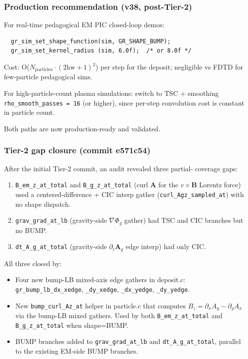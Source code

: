 \documentclass[11pt,a4paper]{article}
\newcommand{\vv}[1]{\mathbf{#1}}
\begin{document}
\subsubsection*{Production recommendation (v38, post-Tier-2)}

For real-time pedagogical EM PIC closed-loop demos:
\begin{eqbox}
\begin{verbatim}
  gr_sim_set_shape_function(sim, GR_SHAPE_BUMP);
  gr_sim_set_kernel_radius (sim, 6.0f);  /* or 8.0f */
\end{verbatim}
\end{eqbox}

Cost: O($N_\mathrm{particles} \cdot (2 \mathrm{hw}+1)^2$) per step for
the deposit; negligible vs FDTD for few-particle pedagogical sims.

For high-particle-count plasma simulations: switch to TSC + smoothing
\texttt{rho\_smooth\_passes = 16} (or higher), since per-step
convolution cost is constant in particle count.

Both paths are now production-ready and validated.

\subsubsection*{Tier-2 gap closure (commit e571c54)}

After the initial Tier-2 commit, an audit revealed three partial-
coverage gaps:

\begin{enumerate}
  \item \texttt{B\_em\_z\_at\_total} and \texttt{B\_g\_z\_at\_total}
    (curl $\vv A$ for the $v\times \vv B$ Lorentz force) used a
    centered-difference + CIC interp gather (\texttt{curl\_Agz\_sampled\_at})
    with no shape dispatch.
  \item \texttt{grav\_grad\_at\_lb} (gravity-side $\nabla\Phi_g$
    gather) had TSC and CIC branches but no BUMP.
  \item \texttt{dt\_A\_g\_at\_total} (gravity-side $\partial_t\vv A_g$
    edge interp) had only CIC.
\end{enumerate}

All three closed by:
\begin{itemize}
  \item Four new bump-LB mixed-axis edge gathers in deposit.c:
    \texttt{gr\_bump\_lb\_dx\_xedge}, \texttt{\_dy\_xedge},
    \texttt{\_dx\_yedge}, \texttt{\_dy\_yedge}.
  \item New \texttt{bump\_curl\_Az\_at} helper in particle.c that
    computes $B_z = \partial_x A_y - \partial_y A_x$ via the bump-LB
    mixed gathers.  Used by both \texttt{B\_em\_z\_at\_total} and
    \texttt{B\_g\_z\_at\_total} when shape=BUMP.
  \item BUMP branches added to \texttt{grav\_grad\_at\_lb} and
    \texttt{dt\_A\_g\_at\_total}, parallel to the existing EM-side
    BUMP branches.
\end{itemize}
\end{document}
